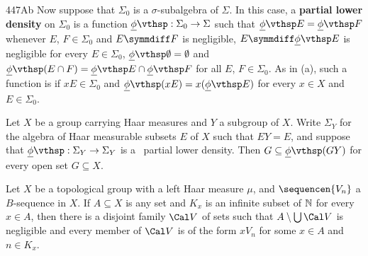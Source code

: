 \spheader 447Ab Now suppose that $\Sigma_0$ is a $\sigma$-subalgebra of
$\Sigma$.   In this case, a {\bf partial lower density} on $\Sigma_0$ is
a function $\undphi:\Sigma_0\to\Sigma$ such that $\undphi E=\undphi F$
whenever $E$, $F\in\Sigma_0$ and $E\symmdiff F$ is negligible,
$E\symmdiff\undphi E$ is negligible for every $E\in\Sigma_0$,
$\undphi\emptyset=\emptyset$ and
$\undphi(E\cap F)=\undphi E\cap\undphi F$ for all $E$, $F\in\Sigma_0$.
  As in (a), such
a function is {\bf \lti} if $xE\in\Sigma_0$ and
$\undphi(xE)=x(\undphi E)$ for every $x\in X$ and $E\in\Sigma_0$.

 Let $X$ be a group carrying Haar measures and $Y$ a
subgroup of $X$.   Write $\Sigma_Y$ for the algebra of Haar
measurable subsets $E$ of $X$ such that $EY=E$, and suppose that
$\undphi:\Sigma_Y\to\Sigma_Y$ is a \lti\ partial lower density.   Then
$G\subseteq\undphi(GY)$ for every open set $G\subseteq X$.


 Let $X$ be a topological group with a
left Haar measure $\mu$, and $\sequencen{V_n}$ a $B$-sequence in
$X$.
If $A\subseteq X$ is any set and $K_x$ is an infinite subset of $\Bbb N$
for every $x\in A$, then there is a disjoint family $\Cal V$ of sets
such that $A\setminus\bigcup\Cal V$ is negligible and every member of
$\Cal V$ is of the form $xV_n$ for some $x\in A$ and $n\in K_x$.

